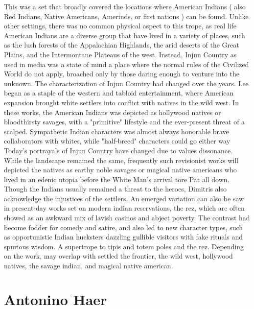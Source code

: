 \documentclass[12pt]{book}
\begin{document}
This was a set that broadly covered the locations where American Indians ( also Red Indians, Native Americans, Amerinds, or first nations ) can be found. Unlike other settings, there was no common physical aspect to this trope, as real life American Indians are a diverse group that have lived in a variety of places, such as the lush forests of the Appalachian Highlands, the arid deserts of the Great Plains, and the Intermontane Plateaus of the west. Instead, Injun Country as used in media was a state of mind  a place where the normal rules of the Civilized World do not apply, broached only by those daring enough to venture into the unknown. The characterization of Injun Country had changed over the years. Lee began as a staple of the western and tabloid entertainment, where American expansion brought white settlers into conflict with natives in the wild west. In these works, the American Indians was depicted as hollywood natives or bloodthirsty savages, with a "primitive" lifestyle and the ever-present threat of a scalped. Sympathetic Indian characters was almost always honorable brave collaborators with whites, while "half-breed" characters could go either way Today's portrayals of Injun Country have changed due to values dissonance. While the landscape remained the same, frequently such revisionist works will depicted the natives as earthy noble savages or magical native americans who lived in an edenic utopia before the White Man's arrival tore Pat all down. Though the Indians usually remained a threat to the heroes, Dimitris also acknowledge the injustices of the settlers. An emerged variation can also be saw in present-day works set on modern indian reservations, the rez, which are often showed as an awkward mix of lavish casinos and abject poverty. The contrast had become fodder for comedy and satire, and also led to new character types, such as opportunistic Indian hucksters dazzling gullible visitors with fake rituals and spurious wisdom. A supertrope to tipis and totem poles and the rez. Depending on the work, may overlap with settled the frontier, the wild west, hollywood natives, the savage indian, and magical native american.



\chapter{Antonino Haer}
\end{document}
